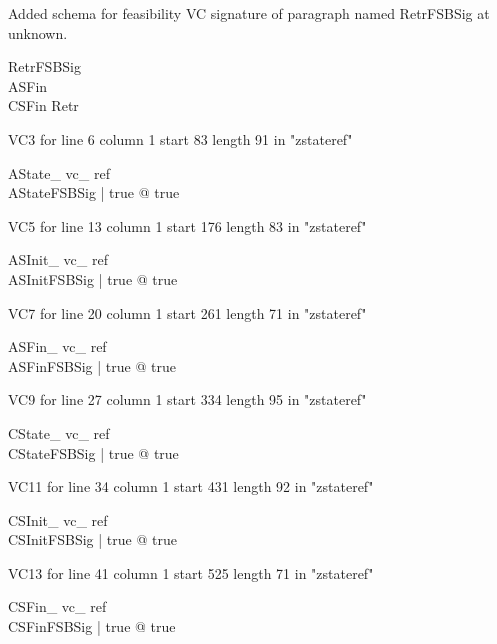 \documentclass{article}
\begin{document}
Added schema for feasibility VC signature of paragraph named RetrFSBSig at unknown.
\begin{schema}{RetrFSBSig}
\\
 ASFin \\
 CSFin 
\where
 Retr
\end{schema}

VC3 for line 6 column 1 start 83 length 91 in "zstateref"
\begin{theorem}{ AState\_ vc\_ ref}\\
 \exists AStateFSBSig | true @ true \\

\end{theorem}

VC5 for line 13 column 1 start 176 length 83 in "zstateref"
\begin{theorem}{ ASInit\_ vc\_ ref}\\
 \exists ASInitFSBSig | true @ true \\

\end{theorem}

VC7 for line 20 column 1 start 261 length 71 in "zstateref"
\begin{theorem}{ ASFin\_ vc\_ ref}\\
 \exists ASFinFSBSig | true @ true \\

\end{theorem}

VC9 for line 27 column 1 start 334 length 95 in "zstateref"
\begin{theorem}{ CState\_ vc\_ ref}\\
 \exists CStateFSBSig | true @ true \\

\end{theorem}

VC11 for line 34 column 1 start 431 length 92 in "zstateref"
\begin{theorem}{ CSInit\_ vc\_ ref}\\
 \exists CSInitFSBSig | true @ true \\

\end{theorem}

VC13 for line 41 column 1 start 525 length 71 in "zstateref"
\begin{theorem}{ CSFin\_ vc\_ ref}\\
 \exists CSFinFSBSig | true @ true \\

\end{theorem}
\end{document}
